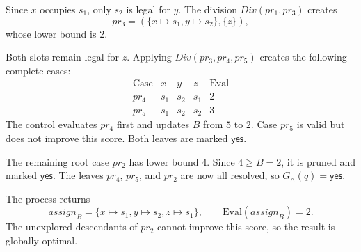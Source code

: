 Since $x$ occupies $s_1$, only $s_2$ is legal for $y$.
The division $\mathit{Div}(pr_1,pr_3)$ creates
\[
pr_3=(\{x\mapsto s_1,y\mapsto s_2\},\{z\}),
\]
whose lower bound is 2.

Both slots remain legal for $z$.
Applying $\mathit{Div}(pr_3,pr_4,pr_5)$ creates
the following complete cases:
\[
\begin{array}{c|ccc|c}
\text{Case} & x & y & z & \mathrm{Eval}\\
\hline
pr_4 & s_1 & s_2 & s_1 & 2\\
pr_5 & s_1 & s_2 & s_2 & 3
\end{array}
\]
The control evaluates $pr_4$ first and updates $B$ from
$5$ to $2$. Case $pr_5$ is valid but does not improve this
score. Both leaves are marked $\mathsf{yes}$.

The remaining root case $pr_2$ has lower bound $4$.
Since $4 \ge B=2$, it is pruned and marked $\mathsf{yes}$.
The leaves $pr_4$, $pr_5$, and $pr_2$ are now all resolved,
so $G_{\land}(q)=\mathsf{yes}$.

The process returns
\[
\mathit{assign}_B
=\{x\mapsto s_1,y\mapsto s_2,z\mapsto s_1\},
\qquad
\mathrm{Eval}(\mathit{assign}_B)=2.
\]
The unexplored descendants of $pr_2$ cannot improve
this score, so the result is globally optimal.